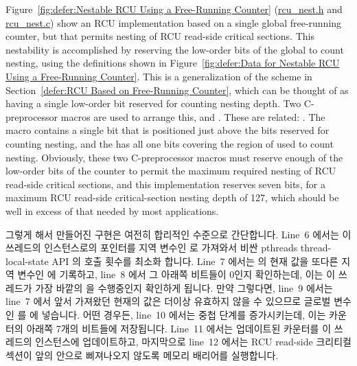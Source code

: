 Figure~\ref{fig:defer:Nestable RCU Using a Free-Running Counter}
(\url{rcu_nest.h} and \url{rcu_nest.c})
show an RCU implementation based on a single global free-running counter,
but that permits nesting of RCU read-side critical sections.
This nestability is accomplished by reserving the low-order bits of the
global  to count nesting, using the definitions shown in
Figure~\ref{fig:defer:Data for Nestable RCU Using a Free-Running Counter}.
This is a generalization of the scheme in
Section~\ref{defer:RCU Based on Free-Running Counter},
which can be thought of as having a single low-order bit reserved
for counting nesting depth.
Two C-preprocessor macros are used to arrange this,
 and
.
These are related: .
The  macro contains a single bit that is
positioned just above the bits reserved for counting nesting,
and the  has all one bits covering the
region of  used to count nesting.
Obviously, these two C-preprocessor macros must reserve enough
of the low-order bits of the counter to permit the maximum required
nesting of RCU read-side critical sections, and this implementation
reserves seven bits, for a maximum RCU read-side critical-section
nesting depth of 127, which should be well in excess of that needed
by most applications.
\fi

그렇게 해서 만들어진  구현은 여전히 합리적인 수준으로
간단합니다.
Line~6 에서는 이 쓰레드의  인스턴스로의 포인터를 지역 변수인
 로 가져와서 비싼 pthreads thread-local-state API 의 호출 횟수를
최소화 합니다.
Line~7 에서는  의 현재 값을 또다른 지역 변수인  에
기록하고, line~8 에서 그 아래쪽 비트들이 0인지 확인하는데, 이는 이 쓰레드가
가장 바깥의  을 수행중인지 확인하게 됩니다.
만약 그렇다면, line~9 에서는 line~7 에서 앞서 가져왔던 현재의 값은 더이상
유효하지 않을 수 있으므로 글로벌 변수인  를  에
넣습니다.
어떤 경우든, line~10 에서는 중첩 단계를 증가시키는데, 이는 카운터의 아래쪽
7개의 비트들에 저장됩니다.
Line~11 에서는 업데이트된 카운터를 이 쓰레드의  인스턴스에
업데이트하고, 마지막으로 line~12 에서는 RCU read-side 크리티컬 섹션이 앞의
 안으로 삐져나오지 않도록 메모리 배리어를 실행합니다.
\iffalse

